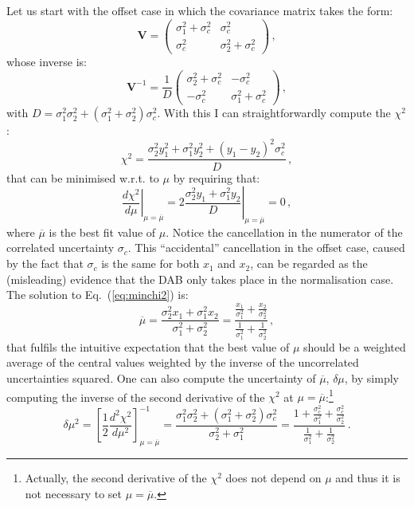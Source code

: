 \documentclass[10pt,a4paper]{article}
\begin{document}
Let us start with the offset case in which the covariance matrix takes
the form:
\begin{equation}
\mathbf{V}=
\begin{pmatrix}
\sigma_1^2+\sigma_c^2& \sigma_c^2\\
\sigma_c^2& \sigma_2^2+\sigma_c^2
\end{pmatrix}\,,
\end{equation}
whose inverse is:
\begin{equation}
\mathbf{V}^{-1}=\frac{1}{D}
\begin{pmatrix}
\sigma_2^2+\sigma_c^2& -\sigma_c^2\\
-\sigma_c^2& \sigma_1^2+\sigma_c^2
\end{pmatrix}\,,
\end{equation}
with $D=\sigma_1^2 \sigma_2^2+(\sigma_1^2+\sigma_2^2)
\sigma_c^2$. With this I can straightforwardly compute the $\chi^2$:
\begin{equation}
\chi^2=\frac{\sigma_2^2y_1^2+\sigma_1^2y_2^2+(y_1-y_2)^2\sigma_c^2}{D}\,,
\end{equation}
that can be minimised w.r.t. to $\mu$ by requiring that:
\begin{equation}\label{eq:minchi2}
  \left.\frac{d\chi^2}{d\mu}\right|_{\mu=\overline{\mu}} = \left.2\frac{\sigma_2^2y_1+\sigma_1^2y_2}{D}\right|_{\mu=\overline{\mu}}=0\,,
\end{equation}
where $\overline{\mu}$ is the best fit value of $\mu$. Notice the
cancellation in the numerator of the correlated uncertainty
$\sigma_c$. This ``accidental'' cancellation in the offset case,
caused by the fact that $\sigma_c$ is the same for both $x_1$ and
$x_2$, can be regarded as the (misleading) evidence that the DAB only
takes place in the normalisation case. The solution to
Eq.~(\ref{eq:minchi2}) is:
\begin{equation}\label{eq:offcv}
\overline{\mu} = \frac{\sigma_2^2x_1+\sigma_1^2x_2}{\sigma_1^2+\sigma_2^2}=\frac{\frac{x_1}{\sigma_1^2}+\frac{x_2}{\sigma_2^2}}{\frac{1}{\sigma_1^2}+\frac{1}{\sigma_2^2}}\,,
\end{equation}
that fulfils the intuitive expectation that the best value of $\mu$
should be a weighted average of the central values weighted by the
inverse of the uncorrelated uncertainties squared. One can also compute
the uncertainty of $\overline{\mu}$, $\delta\mu$, by simply computing
the inverse of the second derivative of the $\chi^2$ at
$\mu=\overline{\mu}$:\footnote{Actually, the second derivative of the
  $\chi^2$ does not depend on $\mu$ and thus it is not necessary to
  set $\mu=\overline{\mu}$.}
\begin{equation}\label{eq:offcvunc}
  \delta\mu^2 = \left[\frac12\frac{d^2\chi^2}{d\mu^2}\right]_{\mu=\overline{\mu}}^{-1} = \frac {\sigma_1^2 \sigma_2^2+(\sigma_1^2+\sigma_2^2) \sigma_c^2}{\sigma_2^2+\sigma_1^2}=\frac {1+\frac{\sigma_c^2}{\sigma_1^2}+\frac{\sigma_c^2}{\sigma_2^2} }{\frac{1}{\sigma_1^2}+\frac{1}{\sigma_2^2}}\,.
\end{equation}
\end{document}
